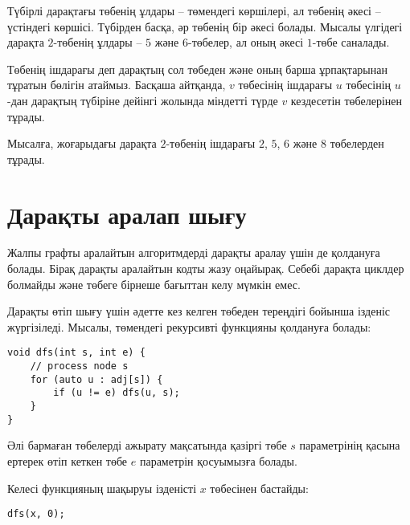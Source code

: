 
Түбірлі дарақтағы төбенің ұлдары -- 
төмендегі көршілері, ал төбенің әкесі --
үстіндегі көршісі. Түбірден басқа, 
әр төбенің бір әкесі болады. Мысалы 
үлгідегі дарақта $2$-төбенің ұлдары -- $5$
және $6$-төбелер, ал оның әкесі $1$-төбе саналады.


Төбенің ішдарағы деп дарақтың сол төбеден және оның барша ұрпақтарынан тұратын бөлігін атаймыз. Басқаша айтқанда, $v$ төбесінің ішдарағы $u$ төбесінің $u$-дан дарақтың түбіріне дейінгі жолында міндетті түрде $v$ кездесетін төбелерінен тұрады.

Мысалға, жоғарыдағы дарақта $2$-төбенің ішдарағы $2$,
$5$, $6$ және $8$ төбелерден тұрады.

\begin{center}
\end{center}

\section{Дарақты аралап шығу}

Жалпы графты аралайтын алгоритмдерді 
дарақты аралау үшін де қолдануға болады.
Бірақ дарақты аралайтын кодты жазу оңайырақ.
Себебі дарақта циклдер болмайды және төбеге
бірнеше бағыттан келу мүмкін емес.

Дарақты өтіп шығу үшін әдетте кез келген төбеден 
тереңдігі бойынша ізденіс жүргізіледі. Мысалы, төмендегі
рекурсивті функцияны қолдануға болады:

\begin{lstlisting}
void dfs(int s, int e) {
    // process node s
    for (auto u : adj[s]) {
        if (u != e) dfs(u, s);
    }
}
\end{lstlisting}

Әлі бармаған төбелерді ажырату мақсатында қазіргі төбе $s$ параметрінің қасына ертерек өтіп кеткен төбе $e$ параметрін қосуымызға болады. 

Келесі функцияның шақыруы ізденісті $x$ төбесінен
бастайды:

\begin{lstlisting}
dfs(x, 0);
\end{lstlisting}

